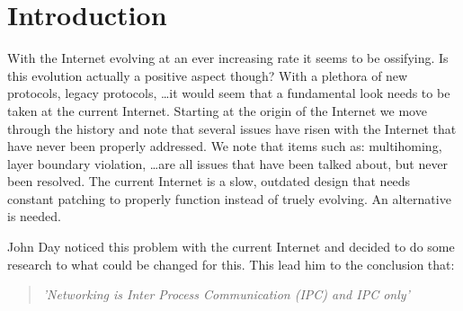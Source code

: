 \chapter{Introduction}

With the Internet evolving at an ever increasing rate it seems to be ossifying. Is this evolution actually a positive aspect though? With a plethora of new protocols, legacy protocols, \ldots it would seem that a fundamental look needs to be taken at the current Internet. Starting at the origin of the Internet we move through the history and note that several issues have risen with the Internet that have never been properly addressed. We note that items such as: multihoming, layer boundary violation, \ldots are all issues that have been talked about, but never been resolved. The current Internet is a slow, outdated design that needs constant patching to properly function instead of truely evolving. An alternative is needed. 

\npar

John Day noticed this problem with the current Internet and decided to do some research to what could be changed for this. This lead him to the conclusion that:

\begin{quote}
	\emph{'Networking is Inter Process Communication (IPC) and IPC only' \citep{johnday2008}}
\end{quote}

